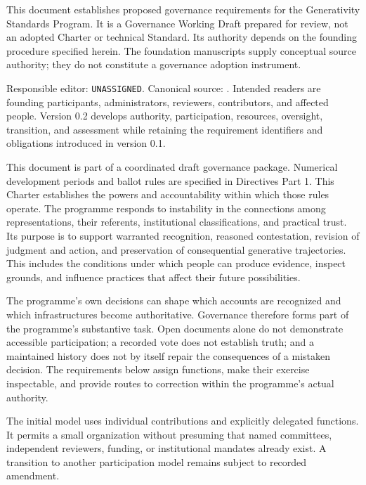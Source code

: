 \documentclass[11pt,a4paper]{article}
\begin{document}
\GSPfrontmatter
{}
This document establishes proposed governance requirements for the Generativity Standards Program. It is a Governance Working Draft prepared for review, not an adopted Charter or technical Standard. Its authority depends on the founding procedure specified herein. The foundation manuscripts supply conceptual source authority; they do not constitute a governance adoption instrument.

Responsible editor: \texttt{UNASSIGNED}. Canonical source: . Intended readers are founding participants, administrators, reviewers, contributors, and affected people. Version 0.2 develops authority, participation, resources, oversight, transition, and assessment while retaining the requirement identifiers and obligations introduced in version 0.1.

This document is part of a coordinated draft governance package. Numerical development periods and ballot rules are specified in Directives Part 1. This Charter establishes the powers and accountability within which those rules operate.
\tableofcontents
\clearpage
{}
The programme responds to instability in the connections among representations, their referents, institutional classifications, and practical trust. Its purpose is to support warranted recognition, reasoned contestation, revision of judgment and action, and preservation of consequential generative trajectories. This includes the conditions under which people can produce evidence, inspect grounds, and influence practices that affect their future possibilities.

The programme's own decisions can shape which accounts are recognized and which infrastructures become authoritative. Governance therefore forms part of the programme's substantive task. Open documents alone do not demonstrate accessible participation; a recorded vote does not establish truth; and a maintained history does not by itself repair the consequences of a mistaken decision. The requirements below assign functions, make their exercise inspectable, and provide routes to correction within the programme's actual authority.

The initial model uses individual contributions and explicitly delegated functions. It permits a small organization without presuming that named committees, independent reviewers, funding, or institutional mandates already exist. A transition to another participation model remains subject to recorded amendment.
\end{document}
